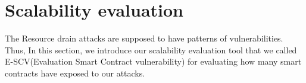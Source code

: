 \chapter{Scalability evaluation}
The Resource drain attacks are supposed to have patterns of vulnerabilities. Thus, In this section, we introduce our scalability evaluation tool that we called E-SCV(Evaluation Smart Contract vulnerability) for evaluating how many smart contracts have exposed to our attacks.   





